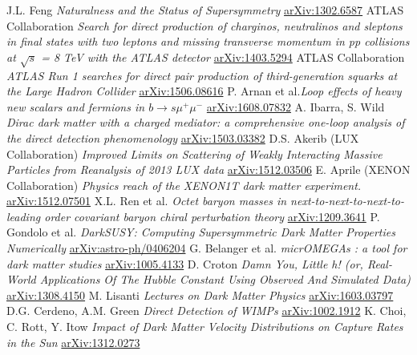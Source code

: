 \begin{thebibliography}{xxx}
 J.L. Feng  \textit{Naturalness and the Status of Supersymmetry} \href{https://arxiv.org/abs/1302.6587}{arXiv:1302.6587}
 ATLAS Collaboration \textit{Search for direct production of charginos, neutralinos and sleptons in final states with two leptons and missing transverse momentum in pp collisions at $\sqrt{s}$ = 8 TeV with the ATLAS detector} \href{https://arxiv.org/abs/1403.5294}{arXiv:1403.5294}
 ATLAS Collaboration \textit{ATLAS Run 1 searches for direct pair production of third-generation squarks at the Large Hadron Collider} \href{https://arxiv.org/abs/1506.08616}{arXiv:1506.08616}
 P. Arnan et al.\textit{Loop effects of heavy new scalars and fermions in $b\rightarrow s\mu^+\mu^-$} \href{https://arxiv.org/abs/1608.07832}{arXiv:1608.07832}
 A. Ibarra, S. Wild \textit{Dirac dark matter with a charged mediator: a comprehensive one-loop analysis of the direct detection phenomenology}  \href{https://arxiv.org/abs/1503.03382}{arXiv:1503.03382}
 D.S. Akerib (LUX Collaboration) \textit{Improved Limits on Scattering of Weakly Interacting Massive Particles from Reanalysis of 2013 LUX data} \href{https://arxiv.org/abs/1512.03506}{arXiv:1512.03506}
 E. Aprile (XENON Collaboration) \textit{Physics reach of the XENON1T dark matter experiment.} \href{https://arxiv.org/abs/1512.07501}{arXiv:1512.07501}
 X.L. Ren et al. \textit{Octet baryon masses in next-to-next-to-next-to-leading order covariant baryon chiral perturbation theory} \href{https://arxiv.org/abs/1209.3641}{arXiv:1209.3641}
 P. Gondolo et al. \textit{DarkSUSY: Computing Supersymmetric Dark Matter Properties Numerically} \href{https://arxiv.org/abs/astro-ph/0406204}{arXiv:astro-ph/0406204}
 G. Belanger et al. \textit{micrOMEGAs : a tool for dark matter studies} \href{https://arxiv.org/abs/1005.4133}{arXiv:1005.4133}
 D. Croton \textit{Damn You, Little h! (or, Real-World Applications Of The Hubble Constant Using Observed And Simulated Data)} \href{https://arxiv.org/abs/1308.4150}{arXiv:1308.4150}
 M. Lisanti \textit{Lectures on Dark Matter Physics} \href{https://arxiv.org/abs/1603.03797}{arXiv:1603.03797}
 D.G. Cerdeno, A.M. Green \textit{Direct Detection of WIMPs} \href{https://arxiv.org/abs/1002.1912}{arXiv:1002.1912}
 K. Choi, C. Rott, Y. Itow \textit{Impact of Dark Matter Velocity Distributions on Capture Rates in the Sun} \href{https://arxiv.org/abs/1312.0273}{arXiv:1312.0273}

\end{thebibliography}
